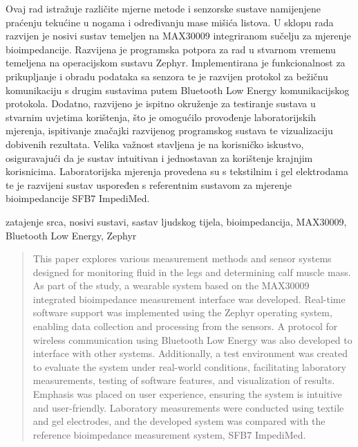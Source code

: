 \documentclass[diplomskirad, numeric, utf8, times]{fer}
\begin{document}

\begin{sazetak}

Ovaj rad istražuje različite mjerne metode i senzorske sustave namijenjene 
praćenju tekućine u nogama i određivanju mase mišića listova.
U sklopu rada razvijen je nosivi sustav temeljen na MAX30009 integriranom sučelju za mjerenje bioimpedancije. 
Razvijena je programska potpora za rad u stvarnom vremenu temeljena na operacijskom sustavu Zephyr. 
Implementirana je funkcionalnost za prikupljanje i obradu podataka sa senzora te je razvijen 
protokol za bežičnu komunikaciju s drugim sustavima putem Bluetooth Low Energy komunikacijskog protokola.
Dodatno, razvijeno je ispitno okruženje za testiranje sustava u stvarnim uvjetima korištenja, 
što je omogućilo provođenje laboratorijskih mjerenja, ispitivanje značajki razvijenog programskog sustava 
te vizualizaciju dobivenih rezultata. 
Velika važnost stavljena je na korisničko iskustvo, osiguravajući da je sustav intuitivan i 
jednostavan za korištenje krajnjim korisnicima.
Laboratorijska mjerenja provedena su s tekstilnim i gel elektrodama te je razvijeni sustav uspoređen 
s referentnim sustavom za mjerenje bioimpedancije SFB7 ImpediMed.

\end{sazetak}

\begin{kljucnerijeci}
zatajenje srca, nosivi sustavi, sastav ljudskog tijela, bioimpedancija, MAX30009, Bluetooth Low Energy, Zephyr 
\end{kljucnerijeci}


\begin{abstract}
This paper explores various measurement methods and sensor systems designed for monitoring fluid 
in the legs and determining calf muscle mass. 
As part of the study, a wearable system based on the MAX30009 integrated bioimpedance 
measurement interface was developed. 
Real-time software support was implemented using the Zephyr operating system, 
enabling data collection and processing from the sensors. 
A protocol for wireless communication using Bluetooth Low Energy 
was also developed to interface with other systems.
Additionally, a test environment was created to evaluate the system under real-world conditions, 
facilitating laboratory measurements, testing of software features, 
and visualization of results. Emphasis was placed on user experience, 
ensuring the system is intuitive and user-friendly. 
Laboratory measurements were conducted using textile and gel electrodes, 
and the developed system was compared with the reference bioimpedance measurement system, SFB7 ImpediMed.
\end{abstract}
\end{document}
